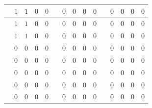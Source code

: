\begin{table}[H]
\begin{tabular}{|c|c|c|c|c|c|c|c|c|c|c|c|c|c|c|}
\hline
\cellcolor{destacado}{\bfseries\boldmath $20$} & \cellcolor{destacado}$1$ & \cellcolor{destacado}$1$ & \cellcolor{destacado}$0$ & \cellcolor{destacado}$0$ & \cellcolor{iteracion}{\bfseries\boldmath $54$} & $0$ & $0$ & $0$ & $0$ & \cellcolor{iteracion}{\bfseries\boldmath $88$} & $0$ & $0$ & $0$ & $0$ \\
\hline
\cellcolor{iteracion}{\bfseries\boldmath $21$} & \cellcolor{cebra}$1$ & \cellcolor{cebra}$1$ & \cellcolor{cebra}$0$ & \cellcolor{cebra}$0$ & \cellcolor{iteracion}{\bfseries\boldmath $55$} & \cellcolor{cebra}$0$ & \cellcolor{cebra}$0$ & \cellcolor{cebra}$0$ & \cellcolor{cebra}$0$ & \cellcolor{iteracion}{\bfseries\boldmath $89$} & \cellcolor{cebra}$0$ & \cellcolor{cebra}$0$ & \cellcolor{cebra}$0$ & \cellcolor{cebra}$0$ \\
\hline
\cellcolor{iteracion}{\bfseries\boldmath $22$} & $1$ & $1$ & $0$ & $0$ & \cellcolor{iteracion}{\bfseries\boldmath $56$} & $0$ & $0$ & $0$ & $0$ & \cellcolor{iteracion}{\bfseries\boldmath $90$} & $0$ & $0$ & $0$ & $0$ \\
\hline
\cellcolor{iteracion}{\bfseries\boldmath $23$} & \cellcolor{cebra}$0$ & \cellcolor{cebra}$0$ & \cellcolor{cebra}$0$ & \cellcolor{cebra}$0$ & \cellcolor{iteracion}{\bfseries\boldmath $57$} & \cellcolor{cebra}$0$ & \cellcolor{cebra}$0$ & \cellcolor{cebra}$0$ & \cellcolor{cebra}$0$ & \cellcolor{iteracion}{\bfseries\boldmath $91$} & \cellcolor{cebra}$0$ & \cellcolor{cebra}$0$ & \cellcolor{cebra}$0$ & \cellcolor{cebra}$0$ \\
\hline
\cellcolor{iteracion}{\bfseries\boldmath $24$} & $0$ & $0$ & $0$ & $0$ & \cellcolor{iteracion}{\bfseries\boldmath $58$} & $0$ & $0$ & $0$ & $0$ & \cellcolor{iteracion}{\bfseries\boldmath $92$} & $0$ & $0$ & $0$ & $0$ \\
\hline
\cellcolor{iteracion}{\bfseries\boldmath $25$} & \cellcolor{cebra}$0$ & \cellcolor{cebra}$0$ & \cellcolor{cebra}$0$ & \cellcolor{cebra}$0$ & \cellcolor{iteracion}{\bfseries\boldmath $59$} & \cellcolor{cebra}$0$ & \cellcolor{cebra}$0$ & \cellcolor{cebra}$0$ & \cellcolor{cebra}$0$ & \cellcolor{iteracion}{\bfseries\boldmath $93$} & \cellcolor{cebra}$0$ & \cellcolor{cebra}$0$ & \cellcolor{cebra}$0$ & \cellcolor{cebra}$0$ \\
\hline
\cellcolor{iteracion}{\bfseries\boldmath $26$} & $0$ & $0$ & $0$ & $0$ & \cellcolor{iteracion}{\bfseries\boldmath $60$} & $0$ & $0$ & $0$ & $0$ & \cellcolor{iteracion}{\bfseries\boldmath $94$} & $0$ & $0$ & $0$ & $0$ \\
\hline
\cellcolor{iteracion}{\bfseries\boldmath $27$} & \cellcolor{cebra}$0$ & \cellcolor{cebra}$0$ & \cellcolor{cebra}$0$ & \cellcolor{cebra}$0$ & \cellcolor{iteracion}{\bfseries\boldmath $61$} & \cellcolor{cebra}$0$ & \cellcolor{cebra}$0$ & \cellcolor{cebra}$0$ & \cellcolor{cebra}$0$ & \cellcolor{iteracion}{\bfseries\boldmath $95$} & \cellcolor{cebra}$0$ & \cellcolor{cebra}$0$ & \cellcolor{cebra}$0$ & \cellcolor{cebra}$0$ \\

\end{tabular}
\end{table}
